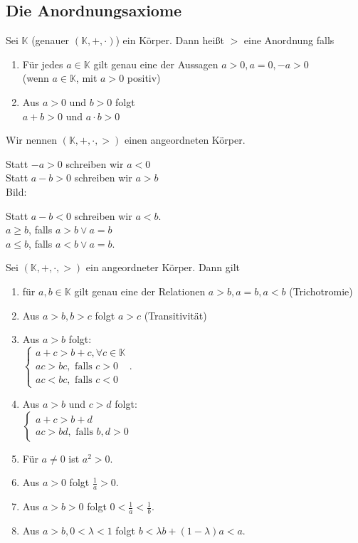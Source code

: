 \documentclass[../ana1.tex]{subfiles}
\begin{document}
\subsection{Die Anordnungsaxiome}
\begin{defi} %
	Sei $\mathbb{K}$ (genauer $(\mathbb{K},+,\cdot)$) ein Körper. Dann heißt $>$ eine Anordnung falls
	\begin{enumerate}
		\item Für jedes $a\in\mathbb{K}$ gilt genau eine der Aussagen $a>0,a=0,-a>0$\\
		      (wenn $a\in\mathbb{K}$, mit $a>0$ positiv)
		\item Aus $a>0$ und $b>0$ folgt\\
		      $a+b>0$ und $a\cdot b>0$
	\end{enumerate}
	Wir nennen $(\mathbb{K},+,\cdot,>)$ einen angeordneten Körper.
\end{defi}
\begin{bem}
	Statt $-a>0$ schreiben wir $a<0$\\
	Statt $a-b>0$ schreiben wir $a>b$\\
	Bild:
	\begin{center}
	\end{center}
	Statt $a-b<0$ schreiben wir $a<b$.\\
	$a \geq b$, falls $a>b \vee a=b$\\
	$a \leq b$, falls $a<b \vee a=b$.
\end{bem}
\begin{satz}
	Sei $(\mathbb{K}, +,\cdot, >)$ ein angeordneter Körper. Dann gilt
	\begin{enumerate}
		\item für $a,b\in\mathbb{K}$ gilt genau eine der Relationen $a>b, a=b, a<b$ (Trichotromie)
		\item Aus $a>b, b>c$ folgt $a>c$ (Transitivität)
		\item Aus $a>b$ folgt:\\
		      $\begin{cases}
				      a+c>b+c, \forall c\in\mathbb{K} \\
				      ac>bc, \text{ falls } c>0       \\
				      ac<bc, \text{ falls } c<0
			      \end{cases}$.
		\item Aus $a>b$ und $c>d$ folgt:\\
		      $\begin{cases}
				      a+c>b+d \\
				      ac>bd, \text{ falls } b,d>0 %
			      \end{cases}$
		\item Für $a\neq 0$ ist $a^2 >0$.
		\item Aus $a>0$ folgt $\frac{1}{a}>0$.
		\item Aus $a>b>0$ folgt $0<\frac{1}{a}<\frac{1}{b}$.
		\item Aus $a>b, 0<\lambda<1$ folgt $b<\lambda b + (1-\lambda)a<a$.
	\end{enumerate}
\end{satz}
\end{document}

